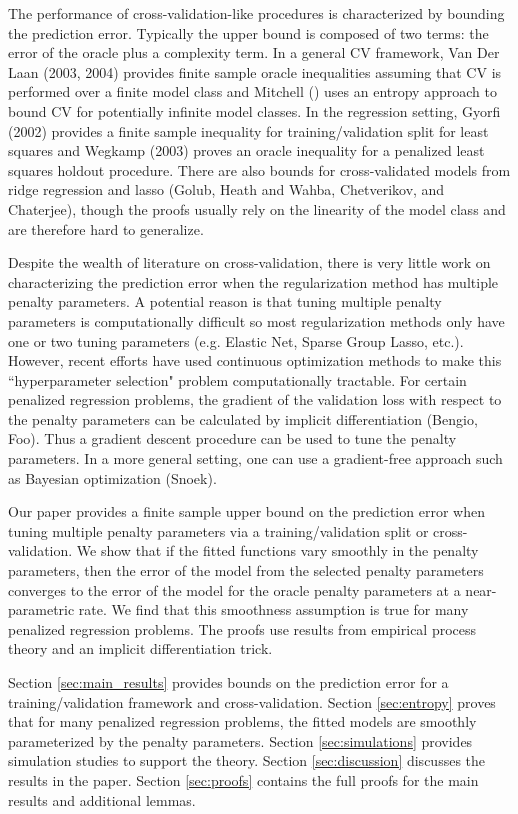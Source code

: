 \documentclass[12pt]{article}
\begin{document}
The performance of cross-validation-like procedures is characterized by bounding the prediction error. Typically the upper bound is composed of two terms: the error of the oracle plus a complexity term. In a general CV framework, Van Der Laan (2003, 2004) provides finite sample oracle inequalities assuming that CV is performed over a finite model class and Mitchell () uses an entropy approach to bound CV for potentially infinite model classes. In the regression setting, Gyorfi (2002) provides a finite sample inequality for training/validation split for least squares and Wegkamp (2003) proves an oracle inequality for a penalized least squares holdout procedure. There are also bounds for cross-validated models from ridge regression and lasso (Golub, Heath and Wahba, Chetverikov, and Chaterjee), though the proofs usually rely on the linearity of the model class and are therefore hard to generalize.

Despite the wealth of literature on cross-validation, there is very little work on characterizing the prediction error when the regularization method has multiple penalty parameters. A potential reason is that tuning multiple penalty parameters is computationally difficult so most regularization methods only have one or two tuning parameters (e.g. Elastic Net, Sparse Group Lasso, etc.). However, recent efforts have used continuous optimization methods to make this ``hyperparameter selection" problem computationally tractable. For certain penalized regression problems, the gradient of the validation loss with respect to the penalty parameters can be calculated by implicit differentiation (Bengio, Foo). Thus a gradient descent procedure can be used to tune the penalty parameters. In a more general setting, one can use a gradient-free approach such as Bayesian optimization (Snoek). 

Our paper provides a finite sample upper bound on the prediction error when tuning multiple penalty parameters via a training/validation split or cross-validation. We show that if the fitted functions vary smoothly in the penalty parameters, then the error of the model from the selected penalty parameters converges to the error of the model for the oracle penalty parameters at a near-parametric rate. We find that this smoothness assumption is true for many penalized regression problems. The proofs use results from empirical process theory and an implicit differentiation trick.

Section \ref{sec:main_results} provides bounds on the prediction error for a training/validation framework and cross-validation.
Section \ref{sec:entropy} proves that for many penalized regression problems, the fitted models are smoothly parameterized by the penalty parameters.
Section \ref{sec:simulations} provides simulation studies to support the theory.
Section \ref{sec:discussion} discusses the results in the paper.
Section \ref{sec:proofs} contains the full proofs for the main results and additional lemmas.
\end{document}
